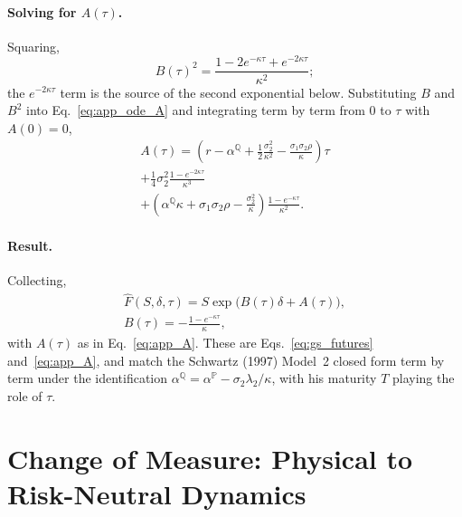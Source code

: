 \documentclass[sigconf, authorversion=true, nonacm=true]{acmart}
\newcommand{\convyield}{\delta}             %
\newcommand{\meanrev}{\kappa}               %
\newcommand{\longrun}{\alpha}               %
\begin{document}
\paragraph{Solving for $A(\tau)$.} Squaring,
\begin{equation}
  \label{eq:app_Bsq}
  B(\tau)^2 = \frac{1 - 2e^{-\meanrev\tau} + e^{-2\meanrev\tau}}{\meanrev^2};
\end{equation}
\noindent
the $e^{-2\meanrev\tau}$ term is the source of the second exponential below. Substituting $B$ and $B^2$ into Eq.~\ref{eq:app_ode_A} and integrating term by term from $0$ to $\tau$ with $A(0) = 0$,
\begin{equation}
  \label{eq:app_A}
  \begin{multlined}
  A(\tau) = \left(r - \longrun^{\mathbb{Q}} + \frac{1}{2}\frac{\sigma_2^2}{\meanrev^2} - \frac{\sigma_1\sigma_2\rho}{\meanrev}\right)\tau \\
  + \frac{1}{4}\sigma_2^2\frac{1 - e^{-2\meanrev\tau}}{\meanrev^3} \\
  + \left(\longrun^{\mathbb{Q}}\meanrev + \sigma_1\sigma_2\rho - \frac{\sigma_2^2}{\meanrev}\right)\frac{1 - e^{-\meanrev\tau}}{\meanrev^2}.
  \end{multlined}
\end{equation}

\paragraph{Result.} Collecting,
\begin{equation}
  \label{eq:app_result}
  \begin{gathered}
  \hat{F}(S, \convyield, \tau) = S\exp\!\big(B(\tau)\convyield + A(\tau)\big), \\
  B(\tau) = -\frac{1 - e^{-\meanrev\tau}}{\meanrev},
  \end{gathered}
\end{equation}
\noindent
with $A(\tau)$ as in Eq.~\ref{eq:app_A}. These are Eqs.~\ref{eq:gs_futures} and~\ref{eq:app_A}, and match the Schwartz (1997) Model~2 closed form term by term under the identification $\longrun^{\mathbb{Q}} = \longrun^{\mathbb{P}} - \sigma_2\lambda_2/\meanrev$, with his maturity $T$ playing the role of $\tau$.



\section{Change of Measure: Physical to Risk-Neutral Dynamics}
\label{app:gs_derivation}
\end{document}
